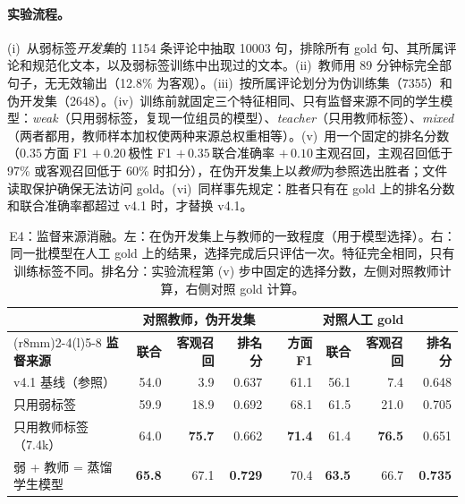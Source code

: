 \documentclass[10pt,twocolumn,a4paper]{article}
\newcommand{\best}[1]{\textbf{#1}}
\begin{document}
\paragraph{实验流程。}(i)~从弱标签\emph{开发集}的 \num{1154} 条评论中抽取 \num{10003} 句，排除所有 gold 句、其所属评论和规范化文本，以及弱标签训练中出现过的文本。(ii)~教师用 89 分钟标完全部句子，无无效输出（12.8\% 为客观）。(iii)~按所属评论划分为伪训练集（\num{7355}）和伪开发集（\num{2648}）。(iv)~训练前就固定三个特征相同、只有监督来源不同的学生模型：\emph{weak}（只用弱标签，复现一位组员的模型）、\emph{teacher}（只用教师标签）、\emph{mixed}（两者都用，教师样本加权使两种来源总权重相等）。(v)~用一个固定的排名分数（$0.35\,$方面 F1 $+\,0.20\,$极性 F1 $+\,0.35\,$联合准确率 $+\,0.10\,$主观召回，主观召回低于 97\% 或客观召回低于 60\% 时扣分），在伪开发集上以\emph{教师}为参照选出胜者；文件读取保护确保无法访问 gold。(vi)~同样事先规定：胜者只有在 gold 上的排名分数和联合准确率都超过 v4.1 时，才替换 v4.1。

\begin{table}[t]
\centering\small
\caption{E4：监督来源消融。左：在伪开发集上与教师的一致程度（用于模型选择）。右：同一批模型在人工 gold 上的结果，选择完成后只评估一次。特征完全相同，只有训练标签不同。排名分：实验流程第 (v) 步中固定的选择分数，左侧对照教师计算，右侧对照 gold 计算。}
\label{tab:distill}
\begin{tabular}{@{}lrrr@{\hspace{8mm}}rrrr@{}}
\toprule
 & \multicolumn{3}{c}{\textbf{对照教师，伪开发集}} & \multicolumn{4}{c}{\textbf{对照人工 gold}} \\
\cmidrule(r{8mm}){2-4}\cmidrule(l){5-8}
\textbf{监督来源} & \textbf{联合} & \textbf{客观召回} & \textbf{排名分} & \textbf{方面 F1} & \textbf{联合} & \textbf{客观召回} & \textbf{排名分} \\
\midrule
v4.1 基线（参照） & 54.0 & 3.9 & 0.637 & 61.1 & 56.1 & 7.4 & 0.648 \\
只用弱标签 & 59.9 & 18.9 & 0.692 & 68.1 & 61.5 & 21.0 & 0.705 \\
只用教师标签（7.4k） & 64.0 & \best{75.7} & 0.662 & \best{71.4} & 61.4 & \best{76.5} & 0.651 \\
\rowcolor{shade} 弱 + 教师 = 蒸馏学生模型 & \best{65.8} & 67.1 & \best{0.729} & 70.4 & \best{63.5} & 66.7 & \best{0.735} \\
\bottomrule
\end{tabular}
\end{table}
\end{document}
